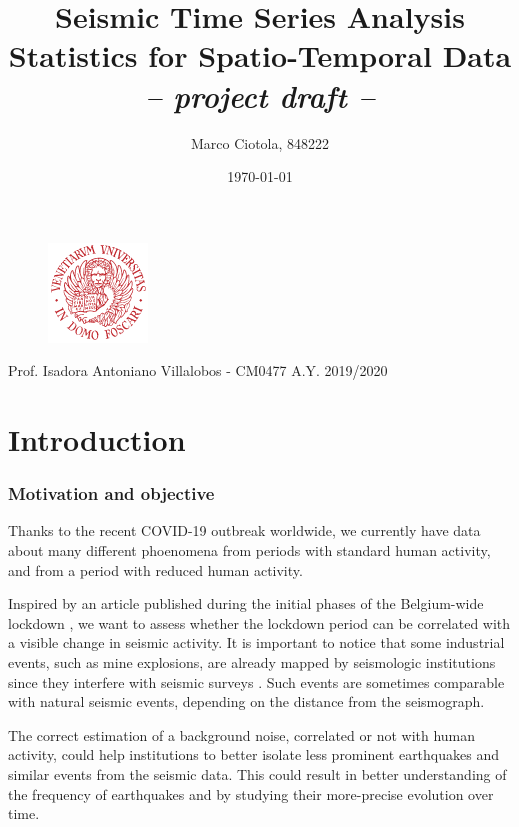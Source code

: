 \documentclass[12pt]{article}
\title{Seismic Time Series Analysis\\Statistics for Spatio-Temporal Data\\\textit{-- project draft --}}
\author{Marco Ciotola, 848222}
\date{\today}
\begin{document}
\maketitle
\begin{figure}[t!]
	\begin{center}
		\includegraphics[width=100px]{ca_foscari_logo.png}
	\end{center}
\end{figure}
\vfill Prof. Isadora Antoniano Villalobos - CM0477
\hfill A.Y. 2019/2020
\newpage
\tableofcontents \clearpage
{}



\section{Introduction}

\subsubsection{Motivation and objective}
Thanks to the recent COVID-19 outbreak worldwide, we currently have data about many different phoenomena from periods with standard human activity, and from a period with reduced human activity.

Inspired by an article published during the initial phases of the Belgium-wide lockdown \cite{NatureCoronavirusSeismic}, we want to assess whether the lockdown period can be correlated with a visible change in seismic activity.
It is important to notice that some industrial events, such as mine explosions, are already mapped by seismologic institutions since they interfere with seismic surveys \cite{OtherSeismicEvents}. Such events are sometimes comparable with natural seismic events, depending on the distance from the seismograph.

The correct estimation of a background noise, correlated or not with human activity, could help institutions to better isolate less prominent earthquakes and similar events from the seismic data. This could result in better understanding of the frequency of earthquakes and by studying their more-precise evolution over time.
\end{document}
